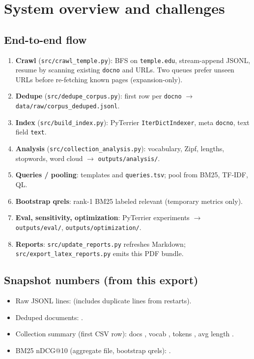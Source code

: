 \section*{System overview and challenges}
\subsection*{End-to-end flow}
\begin{enumerate}
  \item \textbf{Crawl} (\texttt{src/crawl\_temple.py}): BFS on \texttt{temple.edu}, stream-append JSONL, resume by scanning existing \texttt{docno} and URLs. Two queues prefer unseen URLs before re-fetching known pages (expansion-only).
  \item \textbf{Dedupe} (\texttt{src/dedupe\_corpus.py}): first row per \texttt{docno} $\rightarrow$ \texttt{data/raw/corpus\_deduped.jsonl}.
  \item \textbf{Index} (\texttt{src/build\_index.py}): PyTerrier \texttt{IterDictIndexer}, meta \texttt{docno}, text field \texttt{text}.
  \item \textbf{Analysis} (\texttt{src/collection\_analysis.py}): vocabulary, Zipf, lengths, stopwords, word cloud $\rightarrow$ \texttt{outputs/analysis/}.
  \item \textbf{Queries / pooling}: templates and \texttt{queries.tsv}; pool from BM25, TF-IDF, QL.
  \item \textbf{Bootstrap qrels}: rank-1 BM25 labeled relevant (temporary metrics only).
  \item \textbf{Eval, sensitivity, optimization}: PyTerrier experiments $\rightarrow$ \texttt{outputs/eval/}, \texttt{outputs/optimization/}.
  \item \textbf{Reports}: \texttt{src/update\_reports.py} refreshes Markdown; \texttt{src/export\_latex\_reports.py} emits this PDF bundle.
\end{enumerate}

\subsection*{Snapshot numbers (from this export)}
\begin{itemize}
  \item Raw JSONL lines: \textbf{{\RawCorpusLines}} (includes duplicate lines from restarts).
  \item Deduped documents: \textbf{{\DedupDocs}}.
  \item Collection summary (first CSV row): docs {\SummaryDocs}, vocab {\SummaryVocab}, tokens {\SummaryTokens}, avg length {\SummaryAvgLen}.
  \item BM25 nDCG@10 (aggregate file, bootstrap qrels): \textbf{{\BMNDCGTen}}.
\end{itemize}

